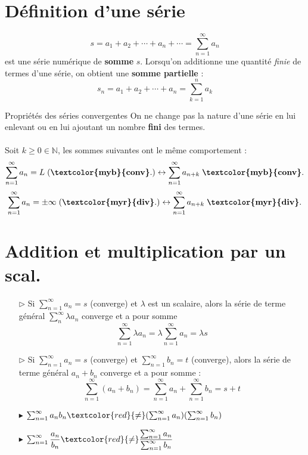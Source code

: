 \documentclass{report}
\begin{document}
\begin{multicols*}{3}
    \section{Définition d'une série}
        $$s = a_1 + a_2 + \cdots + a_n + \cdots = \sum_{n=1}^{\infty }a_n$$
        est une série numérique de \textbf{somme} $s$. Lorsqu'on additionne
        une quantité \textit{finie} de termes d'une série, on obtient une \textbf{somme partielle} :
        $$s_n = a_1 + a_2 + \cdots + a_n = \sum_{k=1}^{n }a_k $$ 

    \begin{theorem}{Propriétés des séries convergentes}{}
        On ne change pas la nature d'une série en lui enlevant ou en lui ajoutant un 
        nombre \textbf{fini} des termes.  
        \\\\
        Soit $k \geq 0 \in \mathbb{N}$, les sommes suivantes ont le même comportement :
        \[%
            \sum_{n=1}^{\infty }a_n = L \; (\textbf{\textcolor{myb}{conv}}.)  
            \leftrightarrow 
            \sum_{n=1}^{\infty }a_{n+k} \; \textbf{\textcolor{myb}{conv}}.  
        \]%
        \[%
            \sum_{n=1}^{\infty }a_n  = \pm \infty \;  (\textbf{\textcolor{myr}{div}}.)  
            \leftrightarrow 
            \sum_{n=1}^{\infty }a_{n+k} \; \textbf{\textcolor{myr}{div}}.  
        \]%
    \end{theorem}               

    \section{Addition et multiplication par un scal.}
    \begin{itemize}
        \item[$\rhd$] Si \(\sum_{n=1}^{\infty } a_n = s\) (converge) et \(\lambda\) est un scalaire, 
            alors la série de terme général 
            \(\sum_{n}^{\infty }\lambda a_n\) converge et a pour somme
        \[
        \sum_{n=1}^{\infty } \lambda a_n = \lambda \sum_{n=1}^{\infty } a_n = \lambda s
        \]
        
        \item[$\rhd$] Si \(\sum_{n=1}^{\infty} a_n = s\) (converge) et 
            \(\sum_{n=1}^{\infty} b_n = t\) (converge), alors la série de terme général \(a_n + b_n\) 
            converge et a pour somme : 
        \[
        \sum_{n=1}^{\infty} (a_n + b_n) = \sum_{n=1}^{\infty } a_n + \sum_{n=1}^{\infty } b_n = s + t
        \]
        \item[$\blacktriangleright$] 
            $\sum_{n=1}^{\infty }a_nb_n \textcolor{red}{\neq} 
            (\sum_{n=1}^{\infty }a_n)(\sum_{n=1}^{\infty}b_n)$
        \item[$\blacktriangleright$]
            $\sum_{n=1}^{\infty }\dfrac{a_n}{b_n} 
            \textcolor{red}{\neq} 
            \dfrac{\sum_{n=1}^{\infty }a_n}{\sum_{n=1}^{\infty }b_n}$
    \end{itemize}


\end{multicols*}
\end{document}
